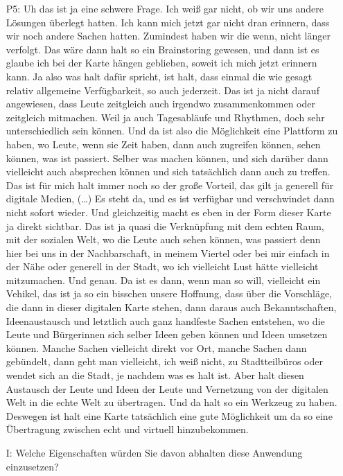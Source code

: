 \begin{itemize}
    \item[P5:] Uh das ist ja eine schwere Frage. Ich wei{\ss} gar nicht, ob wir uns andere L{\"o}sungen {\"u}berlegt hatten. Ich kann mich jetzt gar nicht dran erinnern, dass wir noch andere Sachen hatten. Zumindest haben wir die wenn, nicht l{\"a}nger verfolgt. Das w{\"a}re dann halt so ein Brainstoring gewesen, und dann ist es glaube ich bei der Karte h{\"a}ngen geblieben, soweit ich mich jetzt erinnern kann. Ja also was halt daf{\"u}r spricht, ist halt, dass einmal die wie gesagt relativ allgemeine Verf{\"u}gbarkeit, so auch jederzeit. Das ist ja nicht darauf angewiesen, dass Leute zeitgleich auch irgendwo zusammenkommen oder zeitgleich mitmachen. Weil ja auch Tagesabl{\"a}ufe und Rhythmen, doch sehr unterschiedlich sein k{\"o}nnen. Und da ist also die M{\"o}glichkeit eine Plattform zu haben, wo Leute, wenn sie Zeit haben, dann auch zugreifen k{\"o}nnen, sehen k{\"o}nnen, was ist passiert. Selber was machen k{\"o}nnen, und sich dar{\"u}ber dann vielleicht auch absprechen k{\"o}nnen und sich tats{\"a}chlich dann auch zu treffen. Das ist f{\"u}r mich halt immer noch so der gro{\ss}e Vorteil, das gilt ja generell f{\"u}r digitale Medien, (\dots) Es steht da, und es ist verf{\"u}gbar und verschwindet dann nicht sofort wieder. Und gleichzeitig macht es eben in der Form dieser Karte ja direkt sichtbar. Das ist ja quasi die Verkn{\"u}pfung mit dem echten Raum, mit der sozialen Welt, wo die Leute auch sehen k{\"o}nnen, was passiert denn hier bei uns in der Nachbarschaft, in meinem Viertel oder bei mir einfach in der N{\"a}he oder generell in der Stadt, wo ich vielleicht Lust h{\"a}tte vielleicht mitzumachen. Und genau. Da ist es dann, wenn man so will, vielleicht ein Vehikel, das ist ja so ein bisschen unsere Hoffnung, dass {\"u}ber die Vorschl{\"a}ge, die dann in dieser digitalen Karte stehen, dann daraus auch Bekanntschaften, Ideenaustausch und letztlich auch ganz handfeste Sachen entstehen, wo die Leute und B{\"u}rgerinnen sich selber Ideen geben k{\"o}nnen und Ideen umsetzen k{\"o}nnen. Manche Sachen vielleicht direkt vor Ort, manche Sachen dann geb{\"u}ndelt, dann geht man vielleicht, ich wei{\ss} nicht, zu Stadtteilb{\"u}ros oder wendet sich an die Stadt, je nachdem was es halt ist. Aber halt diesen Austausch der Leute und Ideen der Leute und Vernetzung von der digitalen Welt in die echte Welt zu {\"u}bertragen. Und da halt so ein Werkzeug zu haben. Deswegen ist halt eine Karte tats{\"a}chlich eine gute M{\"o}glichkeit um da so eine {\"U}bertragung zwischen echt und virtuell hinzubekommen.
    \item[I:] Welche Eigenschaften w{\"u}rden Sie davon abhalten diese Anwendung einzusetzen?

\end{itemize}
